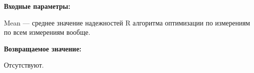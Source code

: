 \textbf{Входные параметры:}

Mean --- среднее значение надежностей R алгоритма оптимизации по измерениям по всем измерениям вообще.

\textbf{Возвращаемое значение:}

Отсутствуют.